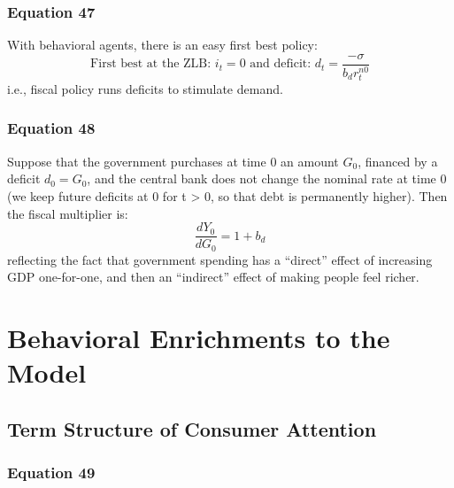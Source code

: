 \documentclass{article}
\begin{document}
\subsubsection*{Equation 47}
With behavioral agents, there is an easy first best policy:
\begin{equation}\tag{47}
    \text{First best at the ZLB: } i_{t}=0 \text{ and deficit: } d_{t}=\frac{-\sigma}{b_{d}r_{t}^{n0}}
\end{equation}
i.e., fiscal policy runs deficits to stimulate demand.

\subsubsection*{Equation 48}
Suppose that the government purchases at time 0 an amount $G_{0}$, financed by a deficit $d_{0}=G_{0}$, and the central bank does not change the nominal
rate at time 0 (we keep future deficits at 0 for t > 0, so that debt is permanently higher). Then the fiscal multiplier is:
\begin{equation}\tag{48}
    \frac{d Y_{0}}{d G_{0}}=1+b_{d}
\end{equation}
reflecting the fact that government spending has a “direct” effect of increasing GDP one-for-one, and then an “indirect” effect of making people feel richer.


\section{Behavioral Enrichments to the Model}

\subsection{Term Structure of Consumer Attention}

\subsubsection*{Equation 49}
\end{document}
